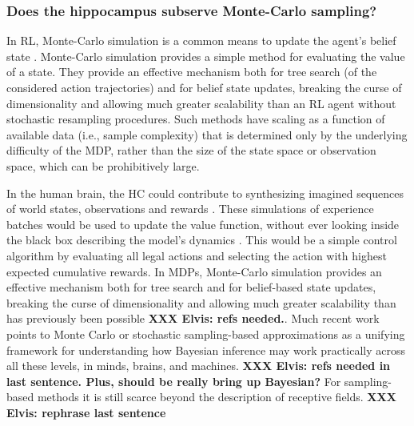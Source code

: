 \documentclass[10pt,letterpaper]{article}
\begin{document}
\subsubsection{Does the hippocampus subserve Monte-Carlo sampling?}
In RL, Monte-Carlo simulation is a common means to update the agent's belief state
\citep{silver2010monte}.
Monte-Carlo simulation provides a simple method for evaluating the value of a state.
They provide an effective mechanism both for tree search (of the considered
action trajectories)
and for belief state updates, breaking the curse of dimensionality and allowing much greater scalability than an RL agent without stochastic resampling procedures.
Such methods have scaling as a function of available data (i.e., sample complexity) that
is determined only by the underlying difficulty of the MDP, rather than the size of the state space or observation space,
which can be prohibitively large.

In the human brain,
the HC could contribute to synthesizing imagined sequences of world states,
observations and rewards \citep{aronov2017, chao2017interaction, boyer2008evolutionary}.
These simulations of experience batches
would be used to update the value function, without ever looking inside the black box describing the model's dynamics \citep{lavilleon2015}.
This would be a simple control algorithm by evaluating all legal actions and selecting the action with
highest expected cumulative rewards.
In MDPs, Monte-Carlo simulation provides an effective mechanism both for tree search and for belief-based state updates, breaking the curse of dimensionality and allowing much greater scalability than has previously been possible
\textbf{XXX Elvis: refs needed.}.
Much recent work points to Monte Carlo or stochastic sampling-based approximations as a unifying framework for understanding how Bayesian inference may work practically across all these levels, in minds, brains, and machines. \textbf{XXX Elvis: refs needed in last sentence. Plus, should be really bring up Bayesian?} For sampling-based methods it is still scarce
beyond the description of receptive fields. \textbf{XXX Elvis: rephrase last sentence}
\end{document}
